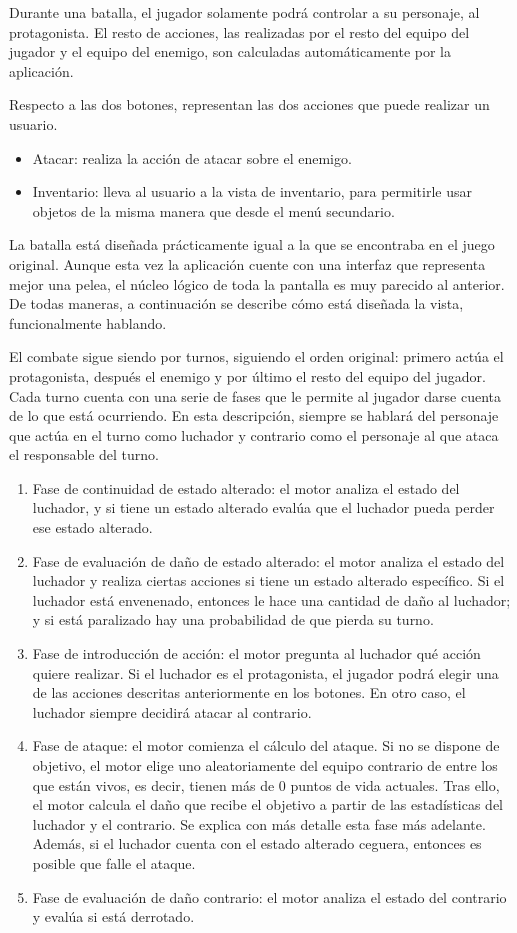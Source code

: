 Durante una batalla, el jugador solamente podrá controlar a su personaje, al protagonista. El resto de acciones, las realizadas por el resto del equipo del jugador y el equipo del enemigo, son calculadas automáticamente por la aplicación. 

Respecto a las dos botones, representan las dos acciones que puede realizar un usuario.
\begin{itemize}
	\item Atacar: realiza la acción de atacar sobre el enemigo.
	\item Inventario: lleva al usuario a la vista de inventario, para permitirle usar objetos de la misma manera que desde el menú secundario.
\end{itemize}

La batalla está diseñada prácticamente igual a la que se encontraba en el juego original. Aunque esta vez la aplicación cuente con una interfaz que representa mejor una pelea, el núcleo lógico de toda la pantalla es muy parecido al anterior. De todas maneras, a continuación se describe cómo está diseñada la vista, funcionalmente hablando. 

El combate sigue siendo por turnos, siguiendo el orden original: primero actúa el protagonista, después el enemigo y por último el resto del equipo del jugador. Cada turno cuenta con una serie de fases que le permite al jugador darse cuenta de lo que está ocurriendo. En esta descripción, siempre se hablará del personaje que actúa en el turno como luchador y contrario como el personaje al que ataca el responsable del turno.

\begin{enumerate}
	\item Fase de continuidad de estado alterado: el motor analiza el estado del luchador, y si tiene un estado alterado evalúa que el luchador pueda perder ese estado alterado.
	\item Fase de evaluación de daño de estado alterado: el motor analiza el estado del luchador y realiza ciertas acciones si tiene un estado alterado específico. Si el luchador está envenenado, entonces le hace una cantidad de daño al luchador; y si está paralizado hay una probabilidad de que pierda su turno.
	\item Fase de introducción de acción: el motor pregunta al luchador qué acción quiere realizar. Si el luchador es el protagonista, el jugador podrá elegir una de las acciones descritas anteriormente en los botones. En otro caso, el luchador siempre decidirá atacar al contrario.
	\item Fase de ataque: el motor comienza el cálculo del ataque. Si no se dispone de objetivo, el motor elige uno aleatoriamente del equipo contrario de entre los que están vivos, es decir, tienen más de 0 puntos de vida actuales. Tras ello, el motor calcula el daño que recibe el objetivo a partir de las estadísticas del luchador y el contrario. Se explica con más detalle esta fase más adelante.
	Además, si el luchador cuenta con el estado alterado ceguera, entonces es posible que falle el ataque.
	\item Fase de evaluación de daño contrario: el motor analiza el estado del contrario y evalúa si está derrotado.
\end{enumerate}

